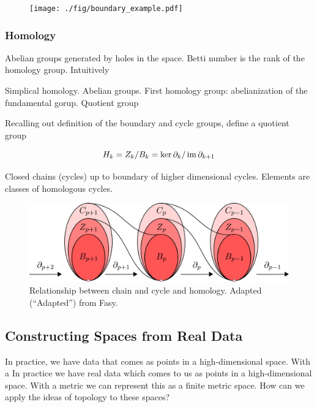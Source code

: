 \begin{figure}
\centering
\texttt{[image: ./fig/boundary\_example.pdf]}
\caption[]{}
\label{background:fig:boundary_example}
\end{figure}

\subsubsection{Homology}

Abelian groups generated by holes in the space.
Betti number is the rank of the homology group.
Intuitively

Simplical homology.
Abelian groups.
First homology group: abelianization of the fundamental gorup.
Quotient group

Recalling out definition of the boundary and cycle groups, define a quotient group

\begin{equation}
H_{k} = Z_{k} / B_{k} = \ker\partial_{k} / \operatorname{im}\partial_{k+1}
\end{equation}

Closed chains (cycles) up to boundary of higher dimensional cycles.
Elements are classes of homologous cycles.

\begin{figure}
\centering\includegraphics[width=\columnwidth]{./fig/FASY_chain_complexes.pdf}
\caption{Relationship between chain and cycle and homology. Adapted (``Adapted'') from Fasy.}
\label{fig:chain_complexes}
\end{figure}


\subsection{Constructing Spaces from Real Data}

In practice, we have data that comes as points in a high-dimensional space.
With a
In practice we have real data which comes to us as points in a high-dimensional space.
With a metric we can represent this as a finite metric space.
How can we apply the ideas of topology to these spaces?

